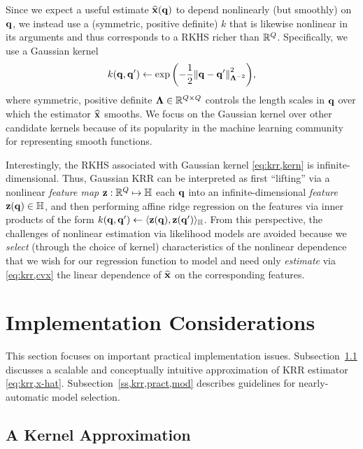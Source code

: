 Since we expect a useful estimate $\est{\bmx}\paren{\bmq}$ 
to depend nonlinearly (but smoothly) on $\mathbf{q}$,
we instead use a 
(symmetric, positive definite) 
$k$ that is likewise nonlinear in its arguments
and thus corresponds to a RKHS richer than $\mathbb{R}^{Q}$. 
Specifically, we use a Gaussian kernel
\begin{align}
	k(\bmq,\bmq') \gets \expa{-\frac{1}{2}\norm{\bmq-\bmq'}^2_{\bmL^{-2}}},
	\label{eq:krr,kern}
\end{align}
where symmetric, positive definite 
$\boldsymbol{\Lambda} \in \mathbb{R}^{Q \times Q}$ 
controls the length scales in $\mathbf{q}$ over which 
the estimator $\widehat{\mathbf{x}}$ smooths.
We focus on the Gaussian kernel
over other candidate kernels
because of its popularity
in the machine learning community 
for representing smooth functions.

Interestingly, 
the RKHS associated 
with Gaussian kernel \eqref{eq:krr,kern}
is infinite-dimensional.
Thus, 
Gaussian KRR
can be interpreted as 
first ``lifting'' 
via a nonlinear \emph{feature map} 
$\mathbf{z} : \mathbb{R}^{Q} \mapsto \mathbb{H}$ 
each $\mathbf{q}$ 
into an infinite-dimensional \emph{feature} $\bmza{\bmq} \in \hilb$,
and then performing affine ridge regression
on the features
via inner products of the form
$k(\bmq,\bmq') \gets \innprod{\bmza{\bmq}}{\bmza{\bmq'}}_{\hilb}$.
From this perspective,
the challenges of nonlinear estimation 
via likelihood models
are avoided 
because we \emph{select} 
(through the choice of kernel) 
characteristics of the nonlinear dependence
that we wish 
for our regression function to model
and need only \emph{estimate} via \eqref{eq:krr,cvx} 
the linear dependence
of $\widehat{\mathbf{x}}$ on the corresponding features.

\section{Implementation Considerations}
\label{s,krr,pract}

This section focuses
on important practical implementation issues.
Subsection~\ref{ss,krr,pract,apprx} discusses
a scalable and conceptually intuitive approximation
of KRR estimator \eqref{eq:krr,x-hat}.
Subsection~\ref{ss,krr,pract,mod} describes guidelines
for nearly-automatic model selection.

\subsection{A Kernel Approximation}
\label{ss,krr,pract,apprx}

